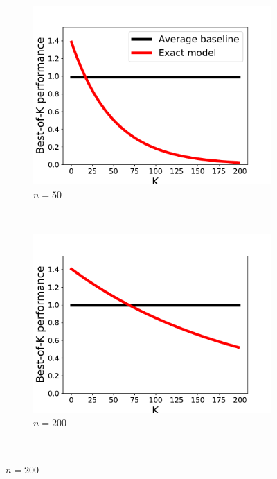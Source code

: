 \documentclass{article}
\begin{document}
\begin{appendices}
  \begin{figure}
    \centering
    \begin{subfigure}[b]{0.3\textwidth}
      \includegraphics[width=\textwidth]{images/best_of_k_toy_n50.pdf}
      \caption{$n=50$}
      \label{fig:gull}
    \end{subfigure}
    ~ %
    \begin{subfigure}[b]{0.3\textwidth}
      \includegraphics[width=\textwidth]{images/best_of_k_toy_n200.pdf}
      \caption{$n=200$}
      \label{fig:tiger}
    \end{subfigure}
    ~ %

\end{figure}
\end{appendices}
\end{document}
